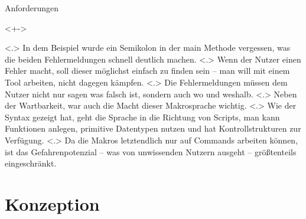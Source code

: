 \begin{frame}{Anforderungen}
\begin{itemize}
        \begin{uncoverenv}<+->
          \begin{myInvBox}[width=.9\linewidth]
            
          \end{myInvBox}
          \vspace{-6em}
        \end{uncoverenv}
            \note[item]<.>{
              In dem Beispiel wurde ein Semikolon in der main Methode vergessen, was die beiden Fehlermeldungen schnell deutlich machen.
            }
            \note[item]<.>{
              Wenn der Nutzer einen Fehler macht, soll dieser möglichst einfach zu finden sein -- man will mit einem Tool arbeiten, nicht dagegen kämpfen.
            }
            \note[item]<.>{
              Die Fehlermeldungen müssen dem Nutzer nicht nur sagen was falsch ist, sondern auch wo und weshalb.
            }
        \onslide<+->
            \note[item]<.>{
              Neben der Wartbarkeit, war auch die Macht dieser Makrosprache wichtig.
            }
            \note[item]<.>{
              Wie der Syntax gezeigt hat, geht die Sprache in die Richtung von Scripts, man kann Funktionen anlegen, primitive Datentypen nutzen und hat Kontrollstrukturen zur Verfügung.
            }
            \note[item]<.>{
              Da die Makros letztendlich nur auf Commands arbeiten können, ist das Gefahrenpotenzial -- was von unwissenden Nutzern ausgeht -- größtenteils eingeschränkt.
            }
    \end{itemize}
  \end{frame}

\section{Konzeption}

